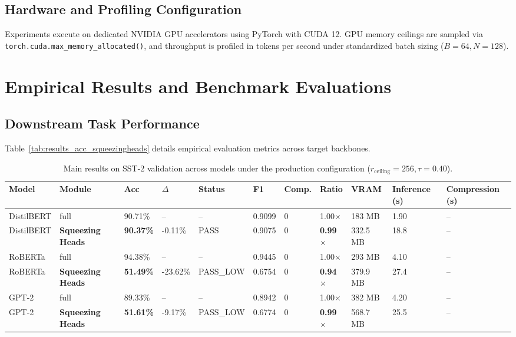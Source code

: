 \subsection{Hardware and Profiling Configuration}
Experiments execute on dedicated NVIDIA GPU accelerators using PyTorch with CUDA 12. GPU memory ceilings are sampled via \texttt{torch.cuda.max\_memory\_allocated()}, and throughput is profiled in tokens per second under standardized batch sizing ($B=64, N=128$).


\section{Empirical Results and Benchmark Evaluations}

\subsection{Downstream Task Performance}
Table~\ref{tab:results_acc_squeezingheads} details empirical evaluation metrics across target backbones.

\begin{table}[t]
\centering
\small
\begin{tabular}{lllllllllll}
\toprule
\textbf{Model} & \textbf{Module} & \textbf{Acc} & \textbf{$\Delta$} & \textbf{Status} & \textbf{F1} & \textbf{Comp.} & \textbf{Ratio} & \textbf{VRAM} & \textbf{Inference (s)} & \textbf{Compression (s)} \\
\midrule
DistilBERT & full & 90.71\% & -- & -- & 0.9099 & 0 & 1.00$\times$ & 183 MB & 1.90 & -- \\
DistilBERT & \textbf{Squeezing Heads} & \textbf{90.37\%} & -0.11\% & PASS & 0.9075 & 0 & \textbf{0.99$\times$} & 332.5 MB & 18.8 & -- \\
RoBERTa & full & 94.38\% & -- & -- & 0.9445 & 0 & 1.00$\times$ & 293 MB & 4.10 & -- \\
RoBERTa & \textbf{Squeezing Heads} & \textbf{51.49\%} & -23.62\% & PASS_LOW & 0.6754 & 0 & \textbf{0.94$\times$} & 379.9 MB & 27.4 & -- \\
GPT-2 & full & 89.33\% & -- & -- & 0.8942 & 0 & 1.00$\times$ & 382 MB & 4.20 & -- \\
GPT-2 & \textbf{Squeezing Heads} & \textbf{51.61\%} & -9.17\% & PASS_LOW & 0.6774 & 0 & \textbf{0.99$\times$} & 568.7 MB & 25.5 & -- \\
\bottomrule
\end{tabular}
\caption{Main results on SST-2 validation across models under the production configuration ($r_{\mathrm{ceiling}}=256, \tau=0.40$).}
\label{tab:main_sst2}
\end{table}

